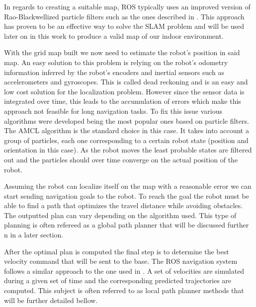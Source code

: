 In regards to creating a suitable map,  \ac{ROS}  typically uses an improved version of  Rao-Blackwellized particle filters such as the ones described in \cite{grisetti2007improved}. This approach has proven to be an effective way to solve the \ac{SLAM} problem and will be used later on in this work to produce a valid map of our indoor environment.

With the grid map built we now need to estimate the robot's position in said map. 
An easy solution to this problem is relying on the robot's odometry information inferred by the robot's encoders and inertial sensors such as accelerometers and gyroscopes. This is called dead reckoning and is an easy and low cost solution for the localization problem. However since the sensor data is integrated over time, this leads to the accumulation of errors which make this approach not feasible for long navigation tasks. 
To fix this issue various algorithms were developed being the most popular ones based on particle filters. The \ac{AMCL} \cite{amclpaper} algorithm  is the standard choice in this case. It takes into account a group of particles, each one corresponding to a certain robot state (position and orientation in this case). As the robot moves the least probable states are filtered out and  the particles should over time converge on the actual position of the robot.  

Assuming the robot can localize itself on the map with a reasonable error we can start sending navigation goals to the robot. To reach the goal the robot must be able to find a path that optimizes the travel distance while avoiding obstacles. The outputted plan can vary depending on the algorithm used. This type of planning is often refereed as a global path planner that will be discussed further n in a later section.

After the optimal plan is computed the final step is to determine the best velocity command that will be sent to the base.  The ROS navigation system follows a similar approach to the one used in \cite{gerkey2008planning}. A set of velocities are simulated during a given set of time and the corresponding predicted trajectories are  computed. This subject is often referred to as local path planner methods that will be further detailed bellow.
